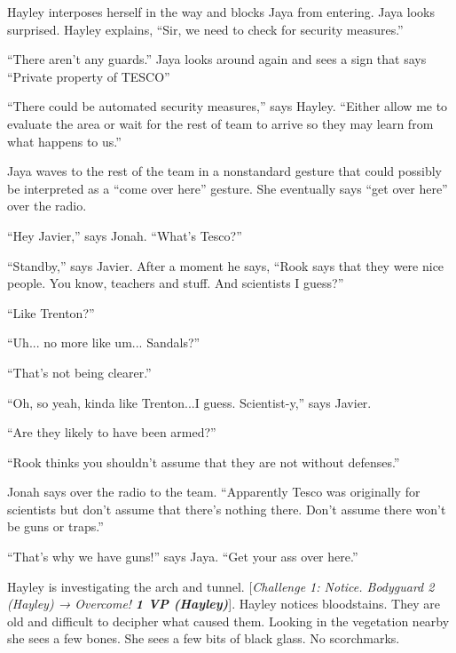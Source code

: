 Hayley interposes herself in the way and blocks Jaya from entering.  Jaya looks surprised.  Hayley explains, ``Sir, we need to check for security measures.''

``There aren't any guards.''  Jaya looks around again and sees a sign that says ``Private property of TESCO''

``There could be automated security measures,'' says Hayley.  ``Either allow me to evaluate the area or wait for the rest of team to arrive so they may learn from what happens to us.''

Jaya waves to the rest of the team in a nonstandard gesture that could possibly be interpreted as a ``come over here'' gesture.  She eventually says ``get over here'' over the radio.

``Hey Javier,'' says Jonah.  ``What's Tesco?''

``Standby,'' says Javier.  After a moment he says, ``Rook says that they were nice people.  You know, teachers and stuff.  And scientists I guess?''

``Like Trenton?''

``Uh... no more like um... Sandals?''

``That's not being clearer.''

``Oh, so yeah, kinda like Trenton...I guess.  Scientist-y,'' says Javier.

``Are they likely to have been armed?''

``Rook thinks you shouldn't assume that they are not without defenses.''

Jonah says over the radio to the team.  ``Apparently Tesco was originally for scientists but don't assume that there's nothing there.  Don't assume there won't be guns or traps.''

``That's why we have guns!'' says Jaya.  ``Get your ass over here.''

Hayley is investigating the arch and tunnel.  {[}\textit{Challenge 1: Notice.  Bodyguard 2 (Hayley) → Overcome! }\textit{\textbf{1 VP (Hayley)}}{]}.   Hayley notices bloodstains.  They are old and difficult to decipher what caused them.  Looking in the vegetation nearby she sees a few bones.  She sees a few bits of black glass.  No scorchmarks.

